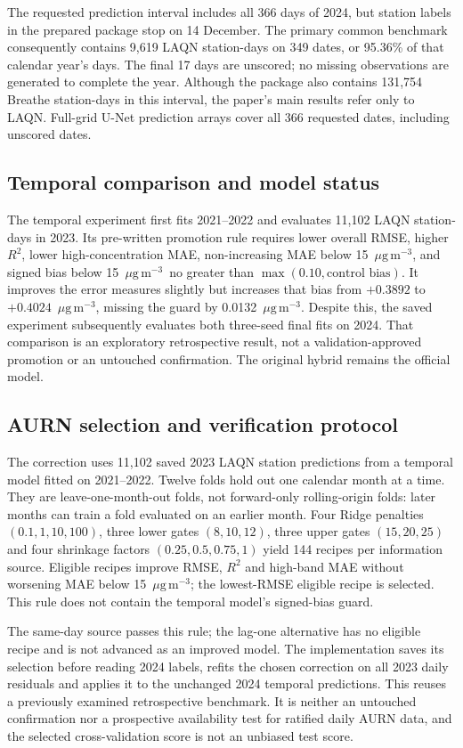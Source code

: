 \documentclass[11pt,a4paper]{article}
\newcommand{\ug}{\ensuremath{\mu\mathrm{g}\,\mathrm{m}^{-3}}}
\begin{document}
The requested prediction interval includes all 366 days of 2024, but station
labels in the prepared package stop on 14 December. The primary common
benchmark consequently contains 9,619 LAQN station-days on 349 dates, or
95.36\% of that calendar year's days. The final 17 days are unscored; no
missing observations are generated to complete the year. Although the package
also contains 131,754 Breathe station-days in this interval, the paper's main
results refer only to LAQN. Full-grid U-Net prediction arrays cover all
366 requested dates, including unscored dates.

\subsection{Temporal comparison and model status}
The temporal experiment first fits 2021--2022 and evaluates 11,102 LAQN
station-days in 2023. Its pre-written promotion rule requires lower overall
RMSE, higher $R^2$, lower high-concentration MAE, non-increasing MAE below
15~\ug, and signed bias below 15~\ug\ no greater than
$\max(0.10,\text{control bias})$. It improves the error measures slightly but
increases that bias from $+0.3892$ to $+0.4024$~\ug, missing the guard by
0.0132~\ug. Despite this, the saved experiment subsequently evaluates both
three-seed final fits on 2024. That comparison is an exploratory retrospective
result, not a validation-approved promotion or an untouched confirmation.
The original hybrid remains the official model.

\subsection{AURN selection and verification protocol}
The correction uses 11,102 saved 2023 LAQN station predictions from a temporal
model fitted on 2021--2022. Twelve folds hold out one calendar month at a time.
They are leave-one-month-out folds, not forward-only rolling-origin folds:
later months can train a fold evaluated on an earlier month. Four Ridge
penalties $(0.1,1,10,100)$, three lower gates $(8,10,12)$, three upper gates
$(15,20,25)$ and four shrinkage factors $(0.25,0.5,0.75,1)$ yield 144 recipes
per information source. Eligible recipes improve RMSE, $R^2$ and high-band
MAE without worsening MAE below 15~\ug; the lowest-RMSE eligible recipe is
selected. This rule does not contain the temporal model's signed-bias guard.

The same-day source passes this rule; the lag-one alternative has no eligible
recipe and is not advanced as an improved model. The implementation saves its
selection before reading 2024 labels, refits the chosen correction on all
2023 daily residuals and applies it to the unchanged 2024 temporal predictions.
This reuses a previously examined retrospective benchmark. It is neither an
untouched confirmation nor a prospective availability test for ratified daily
AURN data, and the selected cross-validation score is not an unbiased test score.
\end{document}
